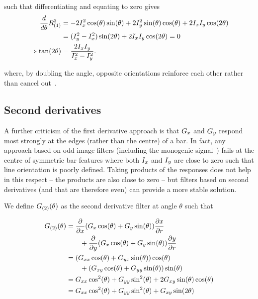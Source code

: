 \noindent such that differentiating and equating to zero gives
%
\begin{align}
\frac{d}{d\theta}R_{(1)}^2
	&= 	-2I_x^2 \cos(\theta)\sin(\theta) + 2I_y^2 \sin(\theta)\cos(\theta) + 2I_xI_y\cos(2\theta) \\
	&= 	(I_y^2-I_x^2) \sin(2\theta) + 2I_xI_y\cos(2\theta) = 0 \\
\Rightarrow \tan(2\theta)
	&= 	\frac{2I_xI_y}{I_x^2-I_y^2}.
\label{e:t1sqr}
\end{align}

\noindent where, by doubling the angle, opposite orientations reinforce each other rather than cancel out~\cite{Mardia_Jupp_00}. 


%


\subsection{Second derivatives}
A further criticism of the first derivative approach is that $G_x$ and $G_y$ respond most strongly at the edges (rather than the centre) of a bar. In fact, any approach based on odd image filters (including the monogenic signal~\cite{Felsberg_Sommer_TSP01}) fails at the centre of symmetric bar features where both $I_x$ and $I_y$ are close to zero such that line orientation is poorly defined. Taking products of the responses does not help in this respect -- the products are also close to zero -- but filters based on second derivatives (and that are therefore even) can provide a more stable solution.

We define $G_{(2)}(\theta)$ as the second derivative filter at angle $\theta$ such that

\begin{align}
\G_{(2)}(\theta)
	&= 	\frac{\partial}{\partial x}(\Gx \cos(\theta) + \Gy \sin(\theta))\frac{\partial x}{\partial r} \notag\\
		&\qquad + \frac{\partial}{\partial y}(\Gx \cos(\theta) + \Gy \sin(\theta))\frac{\partial y}{\partial r} \\
%
	&= 	(\Gxx \cos(\theta) + \Gyx \sin(\theta))\cos(\theta) \notag\\
		&\qquad + (\Gxy \cos(\theta) + \Gyy \sin(\theta))\sin(\theta) \\
%
	&= 	\Gxx\cos^2(\theta) + \Gyy\sin^2(\theta) + 2\Gxy\sin(\theta)\cos(\theta) \\
%
	&=	\Gxx\cos^2(\theta) + \Gyy\sin^2(\theta) + \Gxy\sin(2\theta)
\label{e:ddG}
\end{align}

